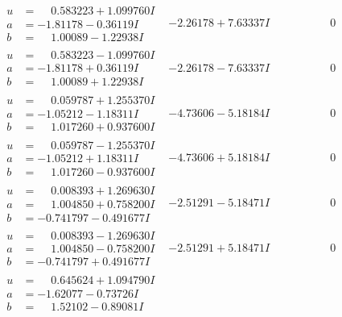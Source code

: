\documentclass[1p]{elsarticle_modified}
\theoremstyle{definition}
\begin{document}
$$\begin{array}{c|c|c}
 \hline 
\begin{aligned}
u &= \phantom{-}0.583223 + 1.099760 I \\
a &= -1.81178 - 0.36119 I \\
b &= \phantom{-}1.00089 - 1.22938 I\end{aligned}
 & -2.26178 + 7.63337 I & \phantom{-0.000000 } 0 \\ \hline\begin{aligned}
u &= \phantom{-}0.583223 - 1.099760 I \\
a &= -1.81178 + 0.36119 I \\
b &= \phantom{-}1.00089 + 1.22938 I\end{aligned}
 & -2.26178 - 7.63337 I & \phantom{-0.000000 } 0 \\ \hline\begin{aligned}
u &= \phantom{-}0.059787 + 1.255370 I \\
a &= -1.05212 - 1.18311 I \\
b &= \phantom{-}1.017260 + 0.937600 I\end{aligned}
 & -4.73606 - 5.18184 I & \phantom{-0.000000 } 0 \\ \hline\begin{aligned}
u &= \phantom{-}0.059787 - 1.255370 I \\
a &= -1.05212 + 1.18311 I \\
b &= \phantom{-}1.017260 - 0.937600 I\end{aligned}
 & -4.73606 + 5.18184 I & \phantom{-0.000000 } 0 \\ \hline\begin{aligned}
u &= \phantom{-}0.008393 + 1.269630 I \\
a &= \phantom{-}1.004850 + 0.758200 I \\
b &= -0.741797 - 0.491677 I\end{aligned}
 & -2.51291 - 5.18471 I & \phantom{-0.000000 } 0 \\ \hline\begin{aligned}
u &= \phantom{-}0.008393 - 1.269630 I \\
a &= \phantom{-}1.004850 - 0.758200 I \\
b &= -0.741797 + 0.491677 I\end{aligned}
 & -2.51291 + 5.18471 I & \phantom{-0.000000 } 0 \\ \hline\begin{aligned}
u &= \phantom{-}0.645624 + 1.094790 I \\
a &= -1.62077 - 0.73726 I \\
b &= \phantom{-}1.52102 - 0.89081 I\end{aligned}

\end{array}$$
\end{document}
